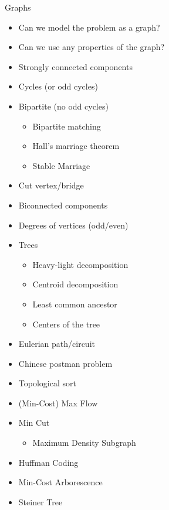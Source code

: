 \begin{myitemize}
\begin{itemize}
          \end{itemize}
        \item Graphs
          \begin{itemize}
            \item Can we model the problem as a graph?
            \item Can we use any properties of the graph?
            \item Strongly connected components
            \item Cycles (or odd cycles)
            \item Bipartite (no odd cycles)
              \begin{itemize}
                \item Bipartite matching
                \item Hall's marriage theorem
                \item Stable Marriage
              \end{itemize}
            \item Cut vertex/bridge
            \item Biconnected components
            \item Degrees of vertices (odd/even)
            \item Trees
              \begin{itemize}
                \item Heavy-light decomposition
                \item Centroid decomposition
                \item Least common ancestor
                \item Centers of the tree
              \end{itemize}
            \item Eulerian path/circuit
            \item Chinese postman problem
            \item Topological sort
            \item (Min-Cost) Max Flow
            \item Min Cut
              \begin{itemize}
                \item Maximum Density Subgraph
              \end{itemize}
            \item Huffman Coding
            \item Min-Cost Arborescence
            \item Steiner Tree

\end{itemize}
\end{myitemize}
